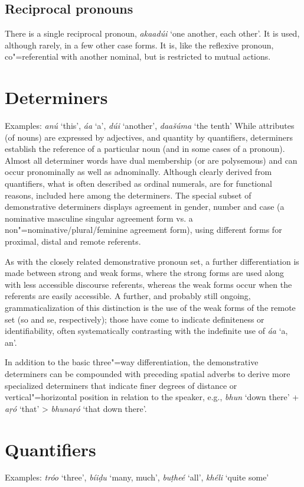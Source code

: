 \subsection{Reciprocal pronouns}
\label{subsec:3b-6-5}
There is a single reciprocal pronoun, \textit{akaadúi} `one another, each other'. It is used, although rarely, in a few other case forms. It is, like the reflexive pronoun, co"=referential with another nominal, but is restricted to mutual actions.


\section{Determiners}
\label{sec:3b-7}
Examples: \textit{anú} `this', \textit{áa} `a', \textit{dúi} `another', \textit{daašúma} `the tenth'
While attributes (of nouns) are expressed by adjectives, and quantity by quantifiers, determiners establish the reference of a particular noun (and in some cases of a pronoun). Almost all determiner words have dual membership (or are polysemous) and can occur pronominally as well as adnominally. Although clearly derived from quantifiers, what is often described as ordinal numerals, are for functional reasons, included here among the determiners. The special subset of demonstrative determiners displays agreement in gender, number and case (a nominative masculine singular agreement form vs. a non"=nominative/plural/feminine agreement form), using different forms for proximal, distal and remote referents.


As with the closely related demonstrative pronoun set, a further differentiation is made between strong and weak forms, where the strong forms are used along with less accessible discourse referents, whereas the weak forms occur when the referents are easily accessible. A further, and probably still ongoing, grammaticalization of this distinction is the use of the weak forms of the remote set (so and se, respectively); those have come to indicate definiteness or identifiability, often systematically contrasting with the indefinite use of \textit{áa} `a, an'.


In addition to the basic three"=way differentiation, the demonstrative determiners can be compounded with preceding spatial adverbs to derive more specialized determiners that  indicate finer degrees of distance or vertical"=horizontal position in relation to the speaker, e.g., \textit{bhun} `down there' + \textit{aṛó} `that' > \textit{bhunaṛó} `that down there'.


\section{Quantifiers}
\label{sec:3b-8}
Examples: \textit{tróo} `three', \textit{bíiḍu} `many, much', \textit{buṭheé} `all', \textit{khéli} `quite some'


